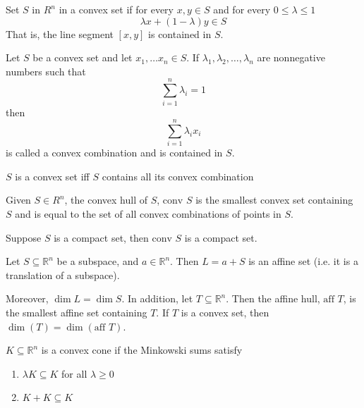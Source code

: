 \begin{definition}
    Set $S$ in $R^n$ in a convex set if for every $x, y \in S$ and for every  $0\leq \lambda \leq 1$ $$\lambda x+(1-\lambda)y\in S$$
    That is, the line segment $[x,y]$ is contained in $S$.
\end{definition}
\begin{definition}
    Let $S$ be a convex set and let $x_1,\ldots x_n \in S$. If $\lambda_1,\lambda_2,\ldots,\lambda_n$ are nonnegative numbers such that $$\sum_{i=1}^{n} \lambda_i = 1$$ then $$\sum^n_{i=1} \lambda_i x_i$$ is called a convex combination and is contained in $S$.
\end{definition}

\begin{lemma}
    $S$ is a convex set iff $S$ contains all its convex combination
\end{lemma}
\begin{definition}
    Given $S\in R^n$, the convex hull of $S$, $\text{conv }S$ is the smallest convex set containing $S$ and is equal to the set of all convex combinations of points in $S$.
\end{definition}

\begin{lemma}
    Suppose $S$ is a compact set, then $\text{conv }S$ is a compact set.
\end{lemma}
\begin{definition}
    Let $S \subseteq \mathbb R^n$ be a subspace, and $a \in \mathbb R^n$. Then $L = a + S$ is an affine set (i.e. it is a translation of a subspace).

    Moreover, $\dim L = \dim S$. In addition, let $T \subseteq \mathbb R^n$. Then the affine hull, $\text{aff }T$, is the smallest affine set containing $T$. If $T$ is a convex set, then $\dim(T) = \dim(\text{aff }T)$.
\end{definition}
\begin{definition}
    $K \subseteq \mathbb R^n$ is a convex cone if the Minkowski sums satisfy
    \begin{enumerate}
        \item $\lambda K \subseteq K$ for all $\lambda \geq 0$
        \item $K + K \subseteq K$
    \end{enumerate}
\end{definition}